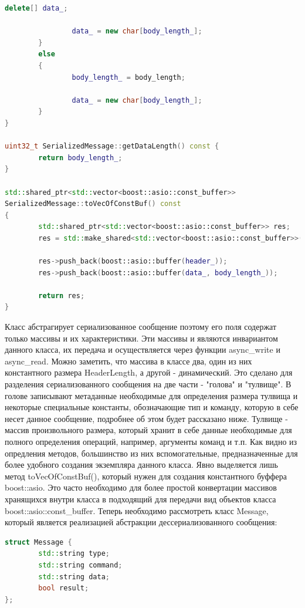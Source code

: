 \documentclass[a4paper, 14pt]{extreport}
\begin{document}
\begin{lstlisting}[language=C++, frame=single, xleftmargin=15pt, caption={Определение методов класса SerializedMessage},label=DescriptiveLabel]
                delete[] data_;
                
                data_ = new char[body_length_];
        }
        else
        {
                body_length_ = body_length;

                data_ = new char[body_length_];
        }
}

uint32_t SerializedMessage::getDataLength() const {
        return body_length_;
}

std::shared_ptr<std::vector<boost::asio::const_buffer>> 
SerializedMessage::toVecOfConstBuf() const
{
        std::shared_ptr<std::vector<boost::asio::const_buffer>> res;
        res = std::make_shared<std::vector<boost::asio::const_buffer>>();

        res->push_back(boost::asio::buffer(header_));
        res->push_back(boost::asio::buffer(data_, body_length_));

        return res;
}
\end{lstlisting}
\par Класс абстрагирует сериализованное сообщение поэтому его поля содержат только массивы и их характеристики. Эти массивы и являются 
инвариантом данного класса, их передача и осуществляется через функции async\_write и async\_read. Можно заметить, что массива в 
классе два, один из них константного размера HeaderLength, а другой - динамический. Это сделано для разделения сериализованного сообщения 
на две части - "голова" и "тулвище". В голове записывают метаданные необходимые для определения размера тулвища и некоторые специальные 
константы, обозначающие тип и команду, которую в себе несет данное сообщение, подробнее об этом будет рассказано ниже. Тулвище - 
массив произвольного размера, который хранит в себе данные необходимые для полного определения операций, например, аргументы команд и 
т.п. Как видно из опредления методов, большинство из них вспомогательные, предназначенные для более удобного создания экземпляра данного 
класса. Явно выделяется лишь метод toVecOfConstBuf(), который нужен для создания константного буффера boost::asio. Это часто необходимо 
для более простой конвертации массивов хранящихся внутри класса в подходящий для передачи вид объектов класса boost::asio::const\_buffer.
Теперь необходимо рассмотреть класс Message, который является реализацией абстракции дессериализованного сообщения:
\begin{lstlisting}[language=C++, frame=single, xleftmargin=15pt, caption={Заголовочный файл класса Message},label=DescriptiveLabel]
struct Message {
        std::string type;
        std::string command;
        std::string data;
        bool result;
};              
\end{lstlisting}
\end{document}
